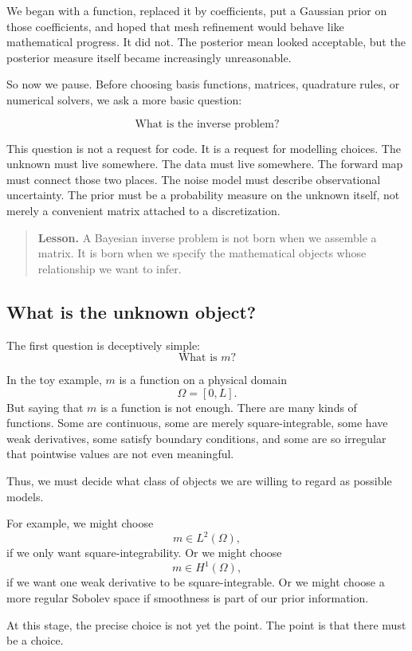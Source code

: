 \documentclass[11pt,a4paper]{book}
\newenvironment{lesson}
  {\begin{quote}\textbf{Lesson.}}
  {\end{quote}}
\begin{document}
We began with a function, replaced it by coefficients, put a Gaussian prior on
those coefficients, and hoped that mesh refinement would behave like
mathematical progress. It did not. The posterior mean looked acceptable, but
the posterior measure itself became increasingly unreasonable.

So now we pause. Before choosing basis functions, matrices, quadrature rules,
or numerical solvers, we ask a more basic question:

\[
    \text{What is the inverse problem?}
\]

This question is not a request for code. It is a request for modelling choices.
The unknown must live somewhere. The data must live somewhere. The forward map
must connect those two places. The noise model must describe observational
uncertainty. The prior must be a probability measure on the unknown itself, not
merely a convenient matrix attached to a discretization.

\begin{lesson}
A Bayesian inverse problem is not born when we assemble a matrix.
It is born when we specify the mathematical objects whose relationship we want
to infer.
\end{lesson}

\subsection{What is the unknown object?}

The first question is deceptively simple:
\[
    \text{What is } m?
\]

In the toy example, $m$ is a function on a physical domain
\[
    \Omega = [0,L].
\]
But saying that $m$ is a function is not enough. There are many kinds of
functions. Some are continuous, some are merely square-integrable, some have
weak derivatives, some satisfy boundary conditions, and some are so irregular
that pointwise values are not even meaningful.

Thus, we must decide what class of objects we are willing to regard as possible
models.

For example, we might choose
\[
    m \in L^2(\Omega),
\]
if we only want square-integrability. Or we might choose
\[
    m \in H^1(\Omega),
\]
if we want one weak derivative to be square-integrable. Or we might choose a
more regular Sobolev space if smoothness is part of our prior information.

At this stage, the precise choice is not yet the point. The point is that there
must be a choice.
\end{document}

